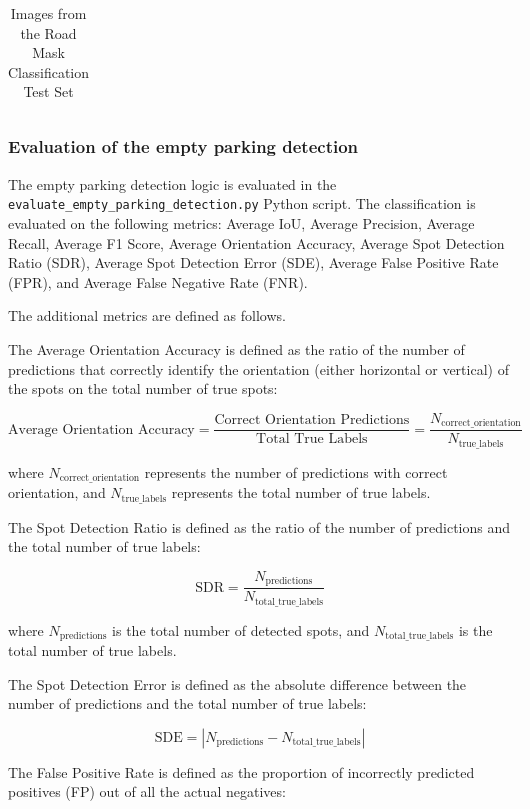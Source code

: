 \begin{table}[htbp]
\begin{tabular}{cc}
  \end{tabular}
  \caption{Images from the Road Mask Classification Test Set}
  \label{tab:test_images1}
  
\end{table}

\newpage{}

\subsubsection{Evaluation of the empty parking detection}
The empty parking detection logic is evaluated in the \texttt{evaluate\_empty\_parking\_detection.py} Python script.
The classification is evaluated on the following metrics: Average IoU, Average Precision, Average Recall, Average F1 Score, Average Orientation Accuracy, Average Spot Detection Ratio (SDR), Average Spot Detection Error (SDE), Average False Positive Rate (FPR), and Average False Negative Rate (FNR).

The additional metrics are defined as follows.

The Average Orientation Accuracy is defined as the ratio of the number of predictions that correctly identify the orientation (either horizontal or vertical) of the spots on the total number of true spots:

\[
  \text{Average Orientation Accuracy} = \frac{\text{Correct Orientation Predictions}}{\text{Total True Labels}}
  = \frac{N_{\text{correct\_orientation}}}{N_{\text{true\_labels}}}
\]

where \( N_{\text{correct\_orientation}} \) represents the number of predictions with correct orientation, and \( N_{\text{true\_labels}} \) represents the total number of true labels.

The Spot Detection Ratio is defined as the ratio of the number of predictions and the total number of true labels:

\[
  \text{SDR} = \frac{N_{\text{predictions}}}{N_{\text{total\_true\_labels}}}
\]

where \( N_{\text{predictions}} \) is the total number of detected spots, and \( N_{\text{total\_true\_labels}} \) is the total number of true labels.

The Spot Detection Error is defined as the absolute difference between the number of predictions and the total number of true labels:

\[
  \text{SDE} = |N_{\text{predictions}} - N_{\text{total\_true\_labels}}|
\]

The False Positive Rate is defined as the proportion of incorrectly predicted positives (FP) out of all the actual negatives:

